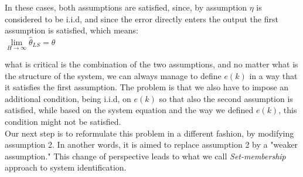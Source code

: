 \begin{example}
\begin{center}
\end{center}
In these cases, both assumptions are satisfied, since, by assumption \(\eta\) is considered to be i.i.d, and since the error directly enters the output the first assumption is satisfied, which means:\\
\(\lim\limits_{H \to \infty} \hat{\theta}_{LS} = \theta\)\\
\end{example}
\newpage
what is critical is the combination of the two assumptions, and no matter what is the structure of the system, we can always manage to define \(e(k)\) in a way that it satisfies the first assumption. The problem is that we also have to impose an additional condition, being i.i.d, on \(e(k)\) so that also the second assumption is satisfied, while based on the system equation and the way we defined \(e(k)\), this condition might not be satisfied.\\

Our next step is to reformulate this problem in a different fashion, by modifying assumption 2. In another words, it is aimed to replace assumption 2 by a "weaker assumption." This change of perspective leads to what we call \textit{Set-membership} approach to system identification.\\


